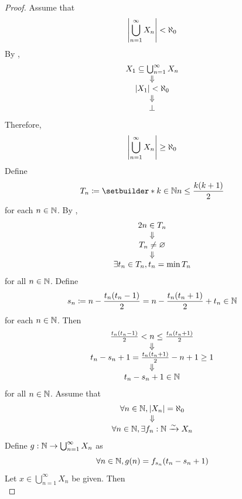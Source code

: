 \begin{proof}
    Assume that
    \[
    \abs*{\bigcup_{n = 1}^{\infty} X_{n}} < \aleph_{0}
    \]
    By ,
    \[
    \begin{array}{c}
        X_{1} \subseteq \bigcup_{n = 1}^{\infty} X_{n} \\
        \Downarrow \\
        \abs*{X_{1}} < \aleph_{0} \\
        \Downarrow \\
        \bot
    \end{array}
    \]
    Therefore,
    \[
    \abs*{\bigcup_{n = 1}^{\infty} X_{n}} \geq \aleph_{0}
    \]
    Define
    \[
    T_{n} \coloneqq \setbuilder*{k \in \N}{n \leq \frac{k(k + 1)}{2}}
    \]
    for each $n \in \N$. By ,
    \[
    \begin{array}{c}
        2n \in T_{n} \\
        \Downarrow \\
        T_{n} \neq \vnot \\
        \Downarrow \\
        \exists t_{n} \in T_{n}, t_{n} = \min T_{n}
    \end{array}
    \]
    for all $n \in \N$. Define
    \[
    s_{n} \coloneqq n - \frac{t_{n}(t_{n} - 1)}{2} = n - \frac{t_{n}(t_{n} + 1)}{2} + t_{n} \in \N
    \]
    for each $n \in \N$. Then
    \[
    \begin{array}{c}
        \frac{t_{n}(t_{n} - 1)}{2} < n \leq \frac{t_{n}(t_{n} + 1)}{2} \\
        \Downarrow \\
        t_{n} - s_{n} + 1 = \frac{t_{n}(t_{n} + 1)}{2} - n + 1 \geq 1 \\
        \Downarrow \\
        t_{n} - s_{n} + 1 \in \N
    \end{array}
    \]
    for all $n \in \N$. Assume that
    \[
    \begin{array}{c}
        \forall n \in \N, \abs*{X_{n}} = \aleph_{0} \\
        \Downarrow \\
        \forall n \in \N, \exists f_{n}: \N \xrightarrow{\sim} X_{n}
    \end{array}
    \]
    Define $g: \N \to \bigcup_{n = 1}^{\infty} X_{n}$ as
    \[
    \forall n \in \N, g(n) = f_{s_{n}}(t_{n} - s_{n} + 1)
    \]
    Let $x \in \bigcup_{n = 1}^{\infty} X_{n}$ be given. Then
    \[
\]
\end{proof}
